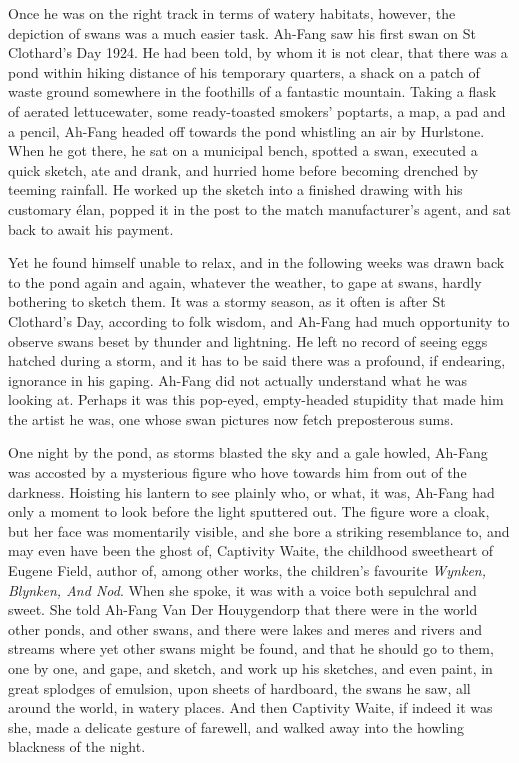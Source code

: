 Once he was on the right track in terms of watery habitats, however, the depiction of swans was a much easier task. Ah-Fang saw his first swan on St Clothard's Day 1924. He had been told, by whom it is not clear, that there was a pond within hiking distance of his temporary quarters, a shack on a patch of waste ground somewhere in the foothills of a fantastic mountain. Taking a flask of aerated lettucewater, some ready-toasted smokers' poptarts, a map, a pad and a pencil, Ah-Fang headed off towards the pond whistling an air by Hurlstone. When he got there, he sat on a municipal bench, spotted a swan, executed a quick sketch, ate and drank, and hurried home before becoming drenched by teeming rainfall. He worked up the sketch into a finished drawing with his customary \'{e}lan, popped it in the post to the match manufacturer's agent, and sat back to await his payment.

Yet he found himself unable to relax, and in the following weeks was drawn back to the pond again and again, whatever the weather, to gape at swans, hardly bothering to sketch them. It was a stormy season, as it often is after St Clothard's Day, according to folk wisdom, and Ah-Fang had much opportunity to observe swans beset by thunder and lightning. He left no record of seeing eggs hatched during a storm, and it has to be said there was a profound, if endearing, ignorance in his gaping. Ah-Fang did not actually understand what he was looking at. Perhaps it was this pop-eyed, empty-headed stupidity that made him the artist he was, one whose swan pictures now fetch preposterous sums.

One night by the pond, as storms blasted the sky and a gale howled, Ah-Fang was accosted by a mysterious figure who hove towards him from out of the darkness. Hoisting his lantern to see plainly who, or what, it was, Ah-Fang had only a moment to look before the light sputtered out. The figure wore a cloak, but her face was momentarily visible, and she bore a striking resemblance to, and may even have been the ghost of, Captivity Waite, the childhood sweetheart of Eugene Field, author of, among other works, the children's favourite \emph{Wynken, Blynken, And Nod}. When she spoke, it was with a voice both sepulchral and sweet. She told Ah-Fang Van Der Houygendorp that there were in the world other ponds, and other swans, and there were lakes and meres and rivers and streams where yet other swans might be found, and that he should go to them, one by one, and gape, and sketch, and work up his sketches, and even paint, in great splodges of emulsion, upon sheets of hardboard, the swans he saw, all around the world, in watery places. And then Captivity Waite, if indeed it was she, made a delicate gesture of farewell, and walked away into the howling blackness of the night.

